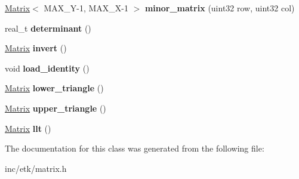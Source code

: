 \begin{DoxyCompactItemize}
\item 
\hypertarget{classetk_1_1_matrix_a8924a5b7c1ef935162ed9513baacdb35}{\hyperlink{classetk_1_1_matrix}{Matrix}$<$ M\-A\-X\-\_\-\-Y-\/1, M\-A\-X\-\_\-\-X-\/1 $>$ {\bfseries minor\-\_\-matrix} (uint32 row, uint32 col)}\label{classetk_1_1_matrix_a8924a5b7c1ef935162ed9513baacdb35}

\item 
\hypertarget{classetk_1_1_matrix_ab19e55e0ee92e6672818c955323e9547}{real\-\_\-t {\bfseries determinant} ()}\label{classetk_1_1_matrix_ab19e55e0ee92e6672818c955323e9547}

\item 
\hypertarget{classetk_1_1_matrix_aa5fabab4740967a5d4b7b13b3ae48288}{\hyperlink{classetk_1_1_matrix}{Matrix} {\bfseries invert} ()}\label{classetk_1_1_matrix_aa5fabab4740967a5d4b7b13b3ae48288}

\item 
\hypertarget{classetk_1_1_matrix_a1b16c550358a1373a1ce8d808b5464bc}{void {\bfseries load\-\_\-identity} ()}\label{classetk_1_1_matrix_a1b16c550358a1373a1ce8d808b5464bc}

\item 
\hypertarget{classetk_1_1_matrix_a4ccb9a463ad121b882d552dd0225a03d}{\hyperlink{classetk_1_1_matrix}{Matrix} {\bfseries lower\-\_\-triangle} ()}\label{classetk_1_1_matrix_a4ccb9a463ad121b882d552dd0225a03d}

\item 
\hypertarget{classetk_1_1_matrix_a0a84efb6306b845df59fc823a88b9118}{\hyperlink{classetk_1_1_matrix}{Matrix} {\bfseries upper\-\_\-triangle} ()}\label{classetk_1_1_matrix_a0a84efb6306b845df59fc823a88b9118}

\item 
\hypertarget{classetk_1_1_matrix_a1e88bf778fd404bc846cc3d260625cd9}{\hyperlink{classetk_1_1_matrix}{Matrix} {\bfseries llt} ()}\label{classetk_1_1_matrix_a1e88bf778fd404bc846cc3d260625cd9}

\end{DoxyCompactItemize}


The documentation for this class was generated from the following file\-:\begin{DoxyCompactItemize}
\item 
inc/etk/matrix.\-h\end{DoxyCompactItemize}
